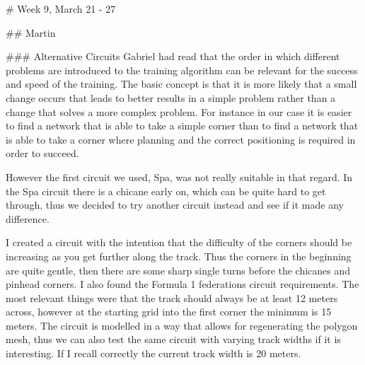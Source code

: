 # Week 9, March 21 - 27


## Martin

### Alternative Circuits
Gabriel had read that the order in which different problems are introduced to the training algorithm can be relevant for the success and speed of the training. The basic concept is that it is more likely that a small change occurs that leads to better results in a simple problem rather than a change that solves a more complex problem. For instance in our case it is easier to find a network that is able to take a simple corner than to find a network that is able to take a corner where planning and the correct positioning is required in order to succeed. 

However the first circuit we used, Spa, was not really suitable in that regard. In the Spa circuit there is a chicane early on, which can be quite hard to get through, thus we decided to try another circuit instead and see if it made any difference. 

I created a circuit with the intention that the difficulty of the corners should be increasing as you get further along the track. Thus the corners in the beginning are quite gentle, then there are some sharp single turns before the chicanes and pinhead corners. I also found the Formula 1 federations circuit requirements. The most relevant things were that the track should always be at least 12 meters across, however at the starting grid into the first corner the minimum is 15 meters. The circuit is modelled in a way that allows for regenerating the polygon mesh, thus we can also test the same circuit with varying track widths if it is interesting. If I recall correctly the current track width is 20 meters. 